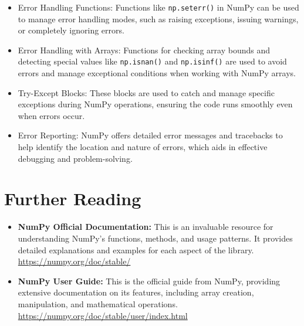 \begin{itemize}
	\item Error Handling Functions: Functions like \texttt{np.seterr()} in NumPy can be used to manage error handling modes, such as raising exceptions, issuing warnings, or completely ignoring errors.
	\item Error Handling with Arrays: Functions for checking array bounds and detecting special values like \texttt{np.isnan()} and \texttt{np.isinf()} are used to avoid errors and manage exceptional conditions when working with NumPy arrays.
	\item Try-Except Blocks: These blocks are used to catch and manage specific exceptions during NumPy operations, ensuring the code runs smoothly even when errors occur. 
	\item Error Reporting: NumPy offers detailed error messages and tracebacks to help identify the location and nature of errors, which aids in effective debugging and problem-solving.
\end{itemize}

\section{Further Reading}

\begin{itemize}
	\item \textbf{NumPy Official Documentation:} This is an invaluable resource for understanding NumPy’s functions, methods, and usage patterns. It provides detailed explanations and examples for each aspect of the library. \url{https://numpy.org/doc/stable/}
	\item\textbf{ NumPy User Guide:} This is the official guide from NumPy, providing extensive documentation on its features, including array creation, manipulation, and mathematical operations.
	\url{https://numpy.org/doc/stable/user/index.html}
\end{itemize}